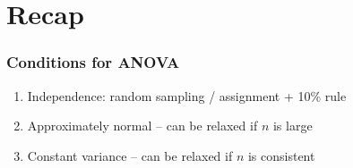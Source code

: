 \documentclass[slidestop,compress,mathserif]{beamer}
\begin{document}

\begin{frame}
\frametitle{}

\vfill


\vfill

\end{frame}



\begin{frame}
\frametitle{}

\vfill


\vfill

\end{frame}


\section{Recap}


\begin{frame}
\frametitle{Conditions for ANOVA}

\begin{enumerate}

\item Independence: random sampling / assignment + 10\% rule

\item Approximately normal -- can be relaxed if $n$ is large

\item Constant variance -- can be relaxed if $n$ is consistent

\end{enumerate}

\end{frame}

\end{document}
